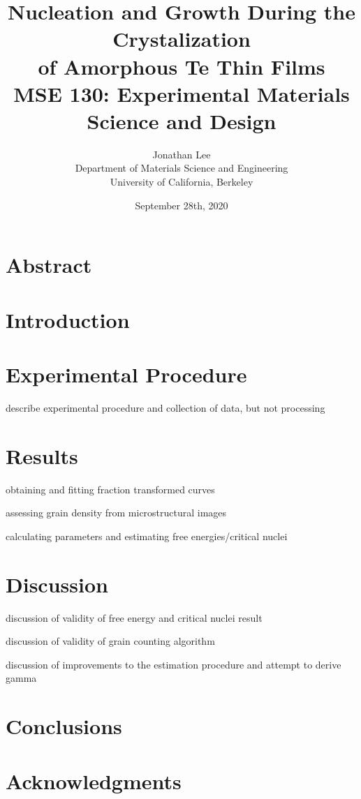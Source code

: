 \documentclass[12pt, titlepage]{article}
\title{\Large Nucleation and Growth During the Crystalization \\
		of Amorphous Te Thin Films \\
		\bigskip
	\normalsize MSE 130: Experimental Materials Science and Design}
\author{\normalsize Jonathan Lee \\
	\normalsize Department of Materials Science and Engineering \\
	\normalsize University of California, Berkeley}
\date{\normalsize September 28th, 2020}
\begin{document}
\maketitle

\doublespacing

\setcounter{page}{2}

\tableofcontents

\newpage

\section{Abstract}

\section{Introduction}



\section{Experimental Procedure}

describe experimental procedure and collection of data, but not processing

\section{Results}

obtaining and fitting fraction transformed curves

assessing grain density from microstructural images

calculating parameters and estimating free energies/critical nuclei



\section{Discussion}

discussion of validity of free energy and critical nuclei result

discussion of validity of grain counting algorithm

discussion of improvements to the estimation procedure and attempt to derive gamma



\section{Conclusions}

\section{Acknowledgments}

\printbibliography[heading=bibnumbered]
\end{document}
